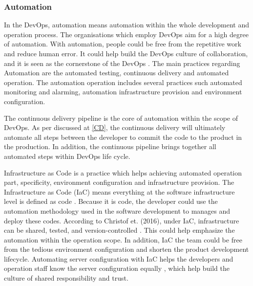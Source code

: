 \subsubsection[]{Automation}
In the DevOps, automation means 
automation within the whole development and operation process. The organisations which employ DevOps aim for a high degree of automation\cite{erich2017qualitative}.
With automation, people could be free from the repetitive work and reduce human error. It could help build the DevOps culture of collaboration, and it is seen as the cornerstone of the DevOps \cite{DevOpsCu76:online}.
The main practices regarding Automation are the automated testing, continuous delivery and automated operation. The automation operation includes several practices such automated monitoring and alarming, automation infrastructure provision and environment configuration.
\par
The continuous delivery pipeline is the core of automation within the scope of DevOps. As per discussed at \ref{CD}, the continuous delivery will ultimately automate all steps between the developer to commit the code to the product in the production. In addition, the continuous pipeline brings together all automated steps within DevOps life cycle.
\par
\label{iasc}
Infrastructure as Code is a practice which helps achieving automated operation part, specificity, environment configuration and infrastructure provision. The Infrastructure as Code (IaC) means everything at the software infrastructure level is defined as code \cite{artac2017devops}. Because it is code, the developer could use the automation methodology used in the software development to manages and deploy these codes. According to Christof et. (2016), under IaC, infrastructure can be shared, tested, and version-controlled \cite{ebert2016devops}. This could help emphasize the automation within the operation scope. In addition, IaC the team could be free from the tedious environment configuration and shorten the product development lifecycle. Automating server configuration with IaC helps the developers and operation staff know the server configuration equally \cite{DevOpsCu76:online}, which help build the culture of shared responsibility and trust.
